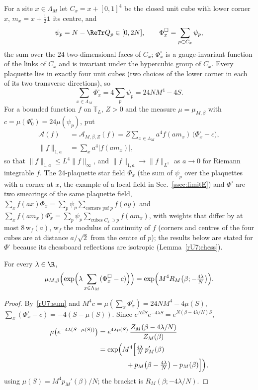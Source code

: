 For a site $x\in\Lambda_M$ let $C_x=x+[0,1]^4$ be the closed unit cube with
lower corner $x$, $m_x=x+\frac12\mathbf 1$ its centre, and
\[
\psi_p=N-\ReTr Q_p\in[0,2N],\qquad
\Phi^\square_x=\sum_{p\subset C_x}\psi_p ,
\]
the sum over the $24$ two-dimensional faces of $C_x$; $\Phi^\square_x$ is a
gauge-invariant function of the links of $C_x$ and is invariant under the
hypercubic group of $C_x$. Every plaquette lies in exactly four unit cubes
(two choices of the lower corner in each of its two transverse directions),
so
\[
\sum_{x\in\Lambda_M}\Phi^\square_x=4\sum_p\psi_p=24NM^4-4S .
\tag{rU7.1}\label{rU7:sum}
\]
For a bounded function $f$ on $\mathbb T_L$, $Z>0$ and the measure
$\mu=\mu_{M,\beta}$ with $c=\mu(\Phi^\square_0)=24\mu(\psi_p)$, put
\begin{align*}
\mathcal A(f)&=\mathcal A_{M,\beta,Z}(f)=Z\sum_{x\in\Lambda_M}a^4f(am_x)\,
\bigl(\Phi^\square_x-c\bigr),\\
\|f\|_{1,a}&=\sum_xa^4|f(am_x)| ,
\end{align*}
so that $\|f\|_{1,a}\le L^4\|f\|_\infty$, and $\|f\|_{1,a}\to\|f\|_{L^1}$ as
$a\to0$ for Riemann integrable $f$. The $24$-plaquette star field $\Phi_x$
(the sum of $\psi_p$ over the plaquettes with a corner at $x$, the example
of a local field in Sec.~\ref{ssec:limitE}) and $\Phi^\square$ are two smearings of the same
plaquette field, $\sum_xf(ax)\Phi_x=\sum_p\psi_p\sum_{\text{corners }y\text{
of }p}f(ay)$ and $\sum_xf(am_x)\Phi^\square_x=\sum_p\psi_p\sum_{\text{cubes }
C_x\supset p}f(am_x)$, with weights that differ by at most $8\,\mathrm w_f(a)$, $\mathrm w_f$ the
modulus of continuity of $f$ (corners and centres of the four cubes are at
distance $a/\sqrt2$ from the centre of $p$); the results below are stated for
$\Phi^\square$ because its chessboard reflections are isotropic
(Lemma~\ref{rU7:chess}).

\begin{lemma}\label{rU7:const}
For every $\lambda\in\R$,
\[
\mu_{M,\beta}\Bigl(\exp\Bigl(\lambda\sum_{x\in\Lambda_M}(\Phi^\square_x-c)
\Bigr)\Bigr)=\exp\Bigl(M^4R_M\bigl(\beta;-\tfrac{4\lambda}N\bigr)\Bigr) .
\]
\end{lemma}

\begin{proof}
By~\eqref{rU7:sum} and $M^4c=\mu(\sum_x\Phi^\square_x)=24NM^4-4\mu(S)$,
$\sum_x(\Phi^\square_x-c)=-4(S-\mu(S))$. Since $e^{N\beta S}e^{-4\lambda S}=
e^{N(\beta-4\lambda/N)S}$,
\begin{align*}
\mu\bigl(e^{-4\lambda(S-\mu(S))}\bigr)&=e^{4\lambda\mu(S)}\,
\frac{Z_M(\beta-4\lambda/N)}{Z_M(\beta)}\\
&=\exp\Bigl(M^4\Bigl[\tfrac{4\lambda}N\,p_M'(\beta)\\
&\qquad\qquad+p_M\bigl(\beta-\tfrac{4\lambda}N\bigr)-p_M(\beta)\Bigr]\Bigr),
\end{align*}
using $\mu(S)=M^4p_M'(\beta)/N$; the bracket is
$R_M(\beta;-4\lambda/N)$.
\end{proof}

